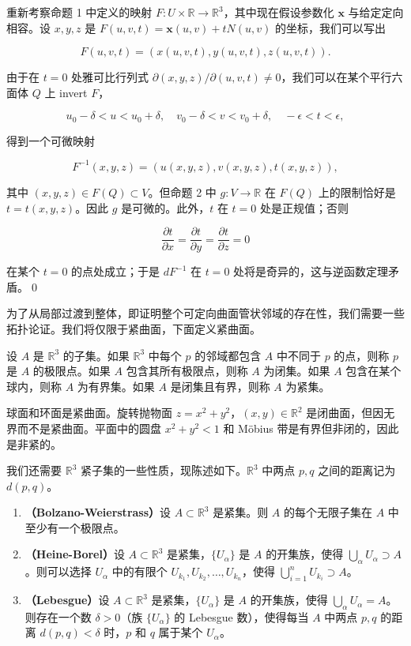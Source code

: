 \begin{Proof}
重新考察命题 1 中定义的映射 $F: U \times \mathbb{R} \to \mathbb{R}^3$，其中现在假设参数化 $\mathbf{x}$ 与给定定向相容。设 $x, y, z$ 是 $F(u, v, t) = \mathbf{x}(u, v) + tN(u, v)$ 的坐标，我们可以写出

\[
F(u, v, t) = (x(u, v, t), y(u, v, t), z(u, v, t)).
\]

由于在 $t = 0$ 处雅可比行列式 $\partial(x, y, z) / \partial(u, v, t) \neq 0$，我们可以在某个平行六面体 $Q$ 上 invert $F$，

\[
u_0 - \delta < u < u_0 + \delta, \quad v_0 - \delta < v < v_0 + \delta, \quad -\epsilon < t < \epsilon,
\]

得到一个可微映射

\[
F^{-1}(x, y, z) = (u(x, y, z), v(x, y, z), t(x, y, z)),
\]

其中 $(x,y,z) \in F(Q) \subset V$。但命题 2 中 $g: V \to \mathbb{R}$ 在 $F(Q)$ 上的限制恰好是 $t = t(x,y,z)$。因此 $g$ 是可微的。此外，$t$ 在 $t = 0$ 处是正规值；否则

\[
\frac{\partial t}{\partial x} = \frac{\partial t}{\partial y} = \frac{\partial t}{\partial z} = 0
\]

在某个 $t = 0$ 的点处成立；于是 $dF^{-1}$ 在 $t = 0$ 处将是奇异的，这与逆函数定理矛盾。\qed
\end{Proof}

为了从局部过渡到整体，即证明整个可定向曲面管状邻域的存在性，我们需要一些拓扑论证。我们将仅限于紧曲面，下面定义紧曲面。

设 $A$ 是 $\mathbb{R}^3$ 的子集。如果 $\mathbb{R}^3$ 中每个 $p$ 的邻域都包含 $A$ 中不同于 $p$ 的点，则称 $p$ 是 $A$ 的极限点。如果 $A$ 包含其所有极限点，则称 $A$ 为闭集。如果 $A$ 包含在某个球内，则称 $A$ 为有界集。如果 $A$ 是闭集且有界，则称 $A$ 为紧集。

球面和环面是紧曲面。旋转抛物面 $z = x^2 + y^2$，$(x, y) \in \mathbb{R}^2$ 是闭曲面，但因无界而不是紧曲面。平面中的圆盘 $x^2 + y^2 < 1$ 和 Möbius 带是有界但非闭的，因此是非紧的。

我们还需要 $\mathbb{R}^3$ 紧子集的一些性质，现陈述如下。$\mathbb{R}^3$ 中两点 $p, q$ 之间的距离记为 $d(p, q)$。

\begin{Properties}[紧集的性质]
\begin{enumerate}
\item\textbf{（Bolzano-Weierstrass）}设 $A \subset \mathbb{R}^3$ 是紧集。则 $A$ 的每个无限子集在 $A$ 中至少有一个极限点。

\item\textbf{（Heine-Borel）}设 $A \subset \mathbb{R}^3$ 是紧集，$\{U_\alpha\}$ 是 $A$ 的开集族，使得 $\bigcup_\alpha U_\alpha \supset A$。则可以选择 $U_\alpha$ 中的有限个 $U_{k_1}, U_{k_2}, \ldots, U_{k_n}$，使得 $\bigcup_{i=1}^n U_{k_i} \supset A$。

\item\textbf{（Lebesgue）}设 $A \subset \mathbb{R}^3$ 是紧集，$\{U_\alpha\}$ 是 $A$ 的开集族，使得 $\bigcup_\alpha U_\alpha = A$。则存在一个数 $\delta > 0$（族 $\{U_\alpha\}$ 的 Lebesgue 数），使得每当 $A$ 中两点 $p, q$ 的距离 $d(p, q) < \delta$ 时，$p$ 和 $q$ 属于某个 $U_\alpha$。
\end{enumerate}
\end{Properties}

